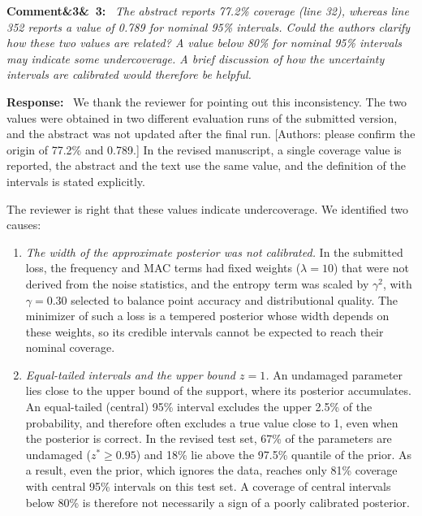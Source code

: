 \documentclass[11pt]{article}
\newenvironment{rcomment}[1]{\par\bigskip\noindent\textbf{Comment\ifx&#1&\else\ #1\fi:}\ \itshape}{\par}
\newenvironment{response}{\par\smallskip\noindent\color{resp}\textbf{Response:}\ }{\par}
\newcommand{\authornote}[1]{\textcolor{note}{\textsf{[Authors: #1]}}}
\begin{document}
\begin{rcomment}{3}
The abstract reports 77.2\% coverage (line 32), whereas line 352 reports a value of 0.789 for nominal 95\% intervals.
Could the authors clarify how these two values are related? A value below 80\% for nominal 95\% intervals may indicate
some undercoverage. A brief discussion of how the uncertainty intervals are calibrated would therefore be helpful.
\end{rcomment}

\begin{response}
We thank the reviewer for pointing out this inconsistency. The two values were obtained in two different evaluation
runs of the submitted version, and the abstract was not updated after the final run.
\authornote{please confirm the origin of 77.2\% and 0.789.} In the revised manuscript, a single coverage value is
reported, the abstract and the text use the same value, and the definition of the intervals is stated explicitly.

The reviewer is right that these values indicate undercoverage. We identified two causes:
\begin{enumerate}[leftmargin=*]
\item \emph{The width of the approximate posterior was not calibrated.} In the submitted loss, the frequency and MAC
terms had fixed weights ($\lambda=10$) that were not derived from the noise statistics, and the entropy term was
scaled by $\gamma^2$, with $\gamma=0.30$ selected to balance point accuracy and distributional quality. The minimizer of such a loss is a tempered posterior
whose width depends on these weights, so its credible intervals cannot be expected to reach their nominal coverage.
\item \emph{Equal-tailed intervals and the upper bound $z=1$.} An undamaged parameter lies close to the upper bound of
the support, where its posterior accumulates. An equal-tailed (central) 95\% interval excludes the upper 2.5\% of the
probability, and therefore often excludes a true value close to 1, even when the posterior is correct. In the revised
test set, 67\% of the parameters are undamaged ($z^*\ge0.95$) and 18\% lie above the 97.5\% quantile of the prior. As a
result, even the prior, which ignores the data, reaches only 81\% coverage with central 95\% intervals on this test set.
A coverage of central intervals below 80\% is therefore not necessarily a sign of a poorly calibrated posterior.
\end{enumerate}


\end{response}
\end{document}
